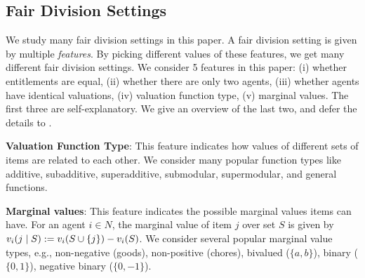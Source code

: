 \subsection{Fair Division Settings}
\label{sec:settings}

We study many fair division settings in this paper.
A fair division setting is given by multiple \emph{features}.
By picking different values of these features, we get many different fair division settings.
We consider 5 features in this paper:
(i) whether entitlements are equal,
(ii) whether there are only two agents,
(iii) whether agents have identical valuations,
(iv) valuation function type,
(v) marginal values.
The first three are self-explanatory. We give an overview of the last two,
and defer the details to .

\textbf{Valuation Function Type}:
This feature indicates how values of different sets of items are related to each other.
We consider many popular function types like additive, subadditive, superadditive,
submodular, supermodular, and general functions.

\textbf{Marginal values}:
This feature indicates the possible marginal values items can have.
For an agent $i \in N$, the marginal value of item $j$ over set $S$
is given by $v_i(j \mid S) := v_i(S \cup \{j\}) - v_i(S)$.
We consider several popular marginal value types, e.g., non-negative (goods), non-positive (chores),
bivalued ($\{a, b\}$), binary ($\{0, 1\}$), negative binary ($\{0, -1\}$).
